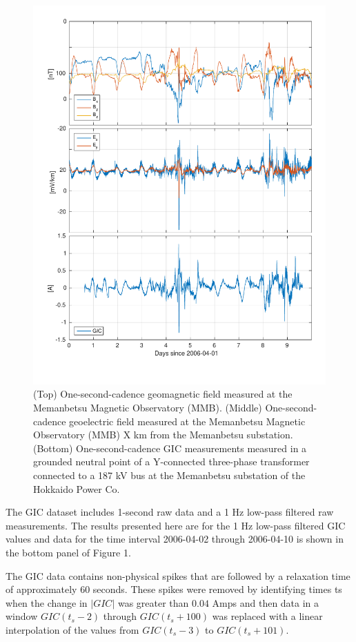 \documentclass[draft,linenumbers]{agujournal2018}
\begin{document}
\begin{figure}[h]
\centering
\includegraphics[width=\textwidth]{figures/plot_raw_All_20060402.pdf}
\caption{(Top) One-second-cadence geomagnetic field measured at the Memanbetsu Magnetic Observatory (MMB). (Middle) One-second-cadence geoelectric field measured at the Memanbetsu Magnetic Observatory (MMB) X km from the Memanbetsu substation. (Bottom) One-second-cadence GIC measurements measured in a grounded neutral point of a Y-connected three-phase transformer connected to a 187 kV bus at the Memanbetsu substation of the Hokkaido Power Co.}
\label{figure1}
\end{figure}

The GIC dataset includes 1-second raw data and a 1 Hz low-pass filtered raw measurements.  The results presented here are for the 1 Hz low-pass filtered GIC values and data for the time interval 2006-04-02 through 2006-04-10 is shown in the bottom panel of Figure 1.

The GIC data contains non-physical spikes that are followed by a relaxation time of approximately 60 seconds. These spikes were removed by identifying times ts when the change in $|GIC|$ was greater than $0.04$ Amps and then data in a window $GIC(t_s-2)$ through $GIC(t_s+100)$ was replaced with a linear interpolation of the values from $GIC(t_s-3)$ to $GIC(t_s + 101)$.
\end{document}

